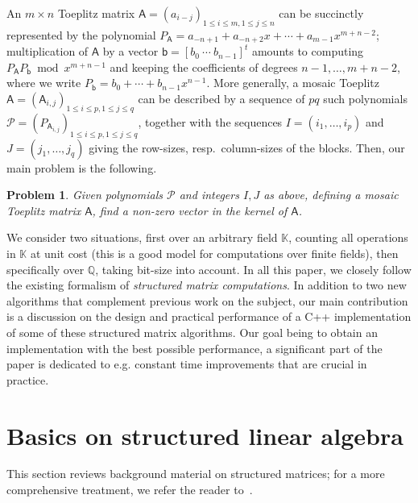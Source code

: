 \documentclass{sig-alternate}
\newcommand{\vb}{\ensuremath{\mathsf{b}}}
\newcommand{\mA}{\ensuremath{\mathsf{A}}}
\newcommand{\K}{\ensuremath{\mathbb{K}}}
\newcommand{\Q}{\ensuremath{\mathbb{Q}}}
\newtheorem{pbm}{Problem}
\begin{document}
An $m \times n$ Toeplitz matrix $\mA=(a_{i-j})_{1\le i \le m, 1 \le j
  \le n}$ can be succinctly represented by the polynomial
$P_\mA=a_{-n+1} + a_{-n+2} x + \cdots + a_{m-1} x^{m+n-2}$;
multiplication of $\mA$ by a vector $\vb=[b_0~\cdots~b_{n-1}]^t$
amounts to computing $P_\mA P_\vb \bmod x^{m+n-1}$ and keeping the
coefficients of degrees $n-1,\dots,m+n-2$, where we write $P_\vb=b_0 +
\cdots + b_{n-1} x^{n-1}$.  More generally, a mosaic Toeplitz
$\mA=(\mA_{i,j})_{1 \le i \le p,1 \le j \le q}$ can be described by a
sequence of $pq$ such polynomials $\mathscr{P}=(P_{\mA_{i,j}})_{1 \le
  i \le p,1 \le j \le q}$, together with the sequences
$I=(i_1,\dots,i_p)$ and $J=(j_1,\dots,j_q)$ giving the row-sizes,
resp.\ column-sizes of the blocks. Then, our main problem is the
following.

\begin{pbm}\label{pb:mosaic}
  Given polynomials $\mathscr{P}$ and integers $I,J$ as above, 
  defining a mosaic Toeplitz matrix $\mA$, find a non-zero
  vector in the kernel of $\mA$.
\end{pbm}
We consider two situations, first over an arbitrary field $\K$,
counting all operations in $\K$ at unit cost (this is a good model for
computations over finite fields), then specifically over $\Q$, taking
bit-size into account. In all this paper, we closely follow the
existing formalism of {\em structured matrix computations}. In
addition to two new algorithms that complement previous work on the
subject, our main contribution is a discussion on the design and
practical performance of a C++ implementation of some of these
structured matrix algorithms. Our goal being to obtain an
implementation with the best possible performance, a significant part
of the paper is dedicated to e.g. constant time improvements that are 
crucial in practice.


\section{Basics on structured linear algebra}\label{sec:basics}

This section reviews background material on structured matrices; for a
more comprehensive treatment, we refer the reader to~\cite{Pan01}.
\end{document}
